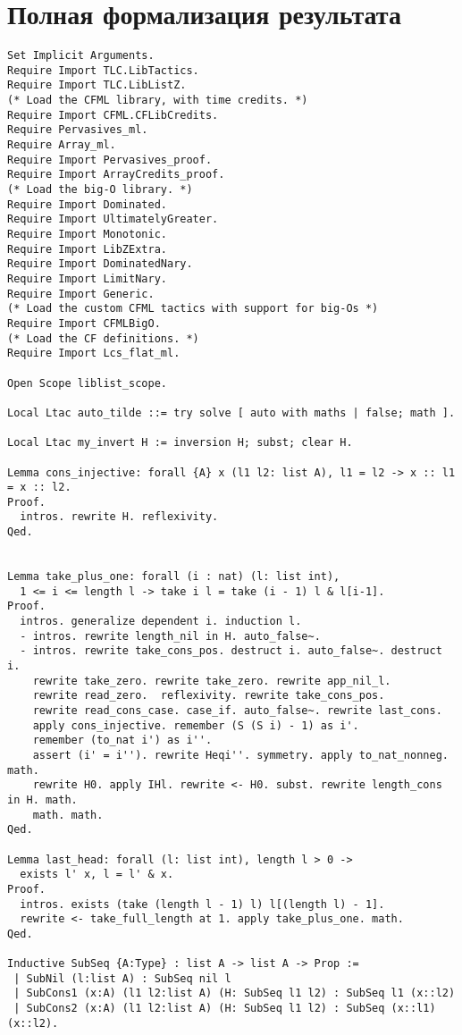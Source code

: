 \section{Полная формализация результата}
\begin{verbatim}
Set Implicit Arguments.
Require Import TLC.LibTactics.
Require Import TLC.LibListZ.
(* Load the CFML library, with time credits. *)
Require Import CFML.CFLibCredits.
Require Pervasives_ml.
Require Array_ml.
Require Import Pervasives_proof.
Require Import ArrayCredits_proof.
(* Load the big-O library. *)
Require Import Dominated.
Require Import UltimatelyGreater.
Require Import Monotonic.
Require Import LibZExtra.
Require Import DominatedNary.
Require Import LimitNary.
Require Import Generic.
(* Load the custom CFML tactics with support for big-Os *)
Require Import CFMLBigO.
(* Load the CF definitions. *)
Require Import Lcs_flat_ml.

Open Scope liblist_scope.

Local Ltac auto_tilde ::= try solve [ auto with maths | false; math ].

Local Ltac my_invert H := inversion H; subst; clear H.

Lemma cons_injective: forall {A} x (l1 l2: list A), l1 = l2 -> x :: l1 = x :: l2. 
Proof.
  intros. rewrite H. reflexivity. 
Qed.


Lemma take_plus_one: forall (i : nat) (l: list int), 
  1 <= i <= length l -> take i l = take (i - 1) l & l[i-1]. 
Proof.
  intros. generalize dependent i. induction l. 
  - intros. rewrite length_nil in H. auto_false~. 
  - intros. rewrite take_cons_pos. destruct i. auto_false~. destruct i. 
    rewrite take_zero. rewrite take_zero. rewrite app_nil_l. 
    rewrite read_zero.  reflexivity. rewrite take_cons_pos. 
    rewrite read_cons_case. case_if. auto_false~. rewrite last_cons. 
    apply cons_injective. remember (S (S i) - 1) as i'. 
    remember (to_nat i') as i''. 
    assert (i' = i''). rewrite Heqi''. symmetry. apply to_nat_nonneg. math. 
    rewrite H0. apply IHl. rewrite <- H0. subst. rewrite length_cons in H. math. 
    math. math. 
Qed.

Lemma last_head: forall (l: list int), length l > 0 -> 
  exists l' x, l = l' & x. 
Proof.
  intros. exists (take (length l - 1) l) l[(length l) - 1]. 
  rewrite <- take_full_length at 1. apply take_plus_one. math. 
Qed.

Inductive SubSeq {A:Type} : list A -> list A -> Prop :=
 | SubNil (l:list A) : SubSeq nil l
 | SubCons1 (x:A) (l1 l2:list A) (H: SubSeq l1 l2) : SubSeq l1 (x::l2)
 | SubCons2 (x:A) (l1 l2:list A) (H: SubSeq l1 l2) : SubSeq (x::l1) (x::l2).


\end{verbatim}

